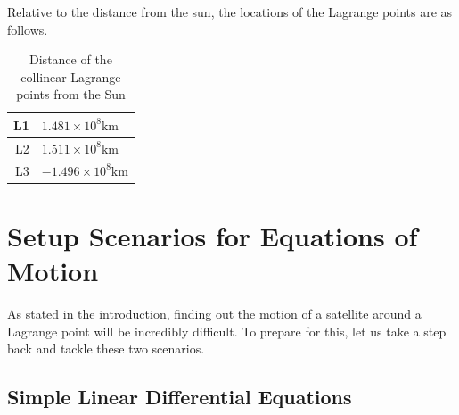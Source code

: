 \documentclass[12pt]{article}
\begin{document}
	Relative to the distance from the sun, the locations of the Lagrange points are as follows.
	\begin{table}[h!]
		\centering
		\label{tab:lagrange-points}
		\caption{Distance of the collinear Lagrange points from the Sun}
		\vspace*{0.3cm}
		\begin{tabular}{|r|l|}
			\hline
			L1 & $1.481\times10^8 \si{\kilo\metre}$ \\
			\hline
			L2 & $1.511\times10^8 \si{\kilo\metre}$ \\
			\hline
			L3 & $-1.496\times10^8 \si{\kilo\metre}$ \\
			\hline
		\end{tabular}
	\end{table}
	
	\section{Setup Scenarios for Equations of Motion}
	
	As stated in the introduction, finding out the motion of a satellite around a Lagrange point will be incredibly difficult.
	To prepare for this, let us take a step back and tackle these two scenarios.
	
	\subsection{Simple Linear Differential Equations} \label{sec:ode}
	
\end{document}
